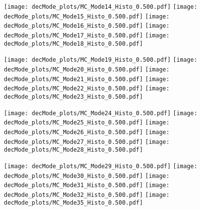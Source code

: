 \documentclass{article}
\begin{document}
\texttt{[image: decMode\_plots/MC\_Mode14\_Histo\_0.500.pdf]}
\texttt{[image: decMode\_plots/MC\_Mode15\_Histo\_0.500.pdf]}
\texttt{[image: decMode\_plots/MC\_Mode16\_Histo\_0.500.pdf]}
\texttt{[image: decMode\_plots/MC\_Mode17\_Histo\_0.500.pdf]}
\texttt{[image: decMode\_plots/MC\_Mode18\_Histo\_0.500.pdf]}

\texttt{[image: decMode\_plots/MC\_Mode19\_Histo\_0.500.pdf]}
\texttt{[image: decMode\_plots/MC\_Mode20\_Histo\_0.500.pdf]}
\texttt{[image: decMode\_plots/MC\_Mode21\_Histo\_0.500.pdf]}
\texttt{[image: decMode\_plots/MC\_Mode22\_Histo\_0.500.pdf]}
\texttt{[image: decMode\_plots/MC\_Mode23\_Histo\_0.500.pdf]}

\texttt{[image: decMode\_plots/MC\_Mode24\_Histo\_0.500.pdf]}
\texttt{[image: decMode\_plots/MC\_Mode25\_Histo\_0.500.pdf]}
\texttt{[image: decMode\_plots/MC\_Mode26\_Histo\_0.500.pdf]}
\texttt{[image: decMode\_plots/MC\_Mode27\_Histo\_0.500.pdf]}
\texttt{[image: decMode\_plots/MC\_Mode28\_Histo\_0.500.pdf]}

\texttt{[image: decMode\_plots/MC\_Mode29\_Histo\_0.500.pdf]}
\texttt{[image: decMode\_plots/MC\_Mode30\_Histo\_0.500.pdf]}
\texttt{[image: decMode\_plots/MC\_Mode31\_Histo\_0.500.pdf]}
\texttt{[image: decMode\_plots/MC\_Mode32\_Histo\_0.500.pdf]}
\texttt{[image: decMode\_plots/MC\_Mode35\_Histo\_0.500.pdf]}
\end{document}
